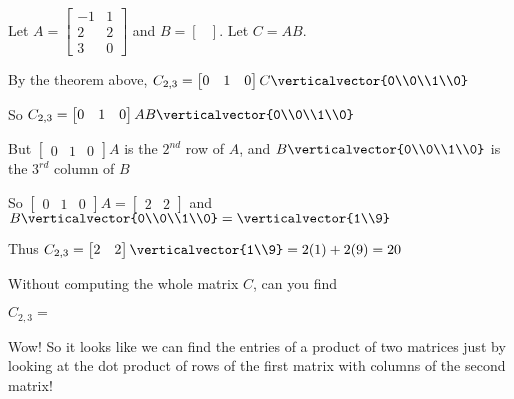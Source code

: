\documentclass{ximera}
\begin{document}
\begin{question}
	Let $A = \begin{bmatrix} -1 &1\\2&2\\3&0 \end{bmatrix}$ and $B = \begin{bmatrix}\end{bmatrix}$.  Let $C = AB$.
	\begin{solution}
		\begin{hint}
			By the theorem above, $C_{2,3} = \begin{bmatrix} 0&1&0\end{bmatrix} C \verticalvector{0\\0\\1\\0}$
		\end{hint}
		\begin{hint}
			So $C_{2,3} = \begin{bmatrix} 0&1&0\end{bmatrix} AB \verticalvector{0\\0\\1\\0}$
		\end{hint}
		\begin{hint}
			But $\begin{bmatrix} 0&1&0\end{bmatrix} A$ is the $2^{nd}$ row of $A$, and $B \verticalvector{0\\0\\1\\0}$ is the $3^{rd}$ column of
			$B$
		\end{hint}
		\begin{hint}
			So $\begin{bmatrix} 0&1&0\end{bmatrix} A = \begin{bmatrix} 2&2\end{bmatrix}$ and $B \verticalvector{0\\0\\1\\0} = \verticalvector{1\\9}$
		\end{hint}
		\begin{hint}
			Thus $C_{2,3} = \begin{bmatrix} 2&2\end{bmatrix} \verticalvector{1\\9} = 2(1)+2(9)=20$ 
		\end{hint}
		Without computing the whole matrix $C$, can you find
	
		$C_{2,3} = $ 
		
	\end{solution}
	
	Wow!  So it looks like we can find the entries of a product of two matrices just by looking at the dot product of rows of the first matrix with columns of
	the second matrix!
\end{question}
\end{document}
